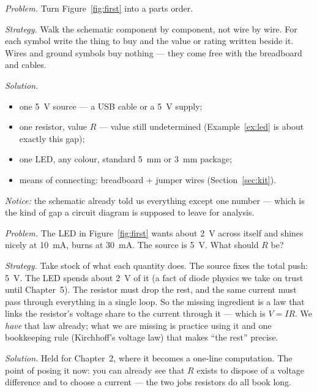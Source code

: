 \begin{example}
\label{ex:partslist}
\emph{Problem.} Turn Figure~\ref{fig:first} into a parts order.\par
\emph{Strategy.} Walk the schematic component by component, not wire by wire.
For each symbol write the thing to buy and the value or rating written beside
it. Wires and ground symbols buy nothing — they come free with the breadboard
and cables.\par
\emph{Solution.}
\begin{itemize}
\item one \qty{5}{\volt} source — a USB cable or a \qty{5}{\volt} supply;
\item one resistor, value $R$ — value still undetermined
(Example~\ref{ex:led} is about exactly this gap);
\item one LED, any colour, standard \qty{5}{\milli\metre} or
\qty{3}{\milli\metre} package;
\item means of connecting: breadboard + jumper wires (Section~\ref{sec:kit}).
\end{itemize}
\emph{Notice:} the schematic already told us everything except one number —
which is the kind of gap a circuit diagram is supposed to leave for analysis.
\end{example}

\begin{example}
\label{ex:led}
\emph{Problem.} The LED in Figure~\ref{fig:first} wants about \qty{2}{\volt}
across itself and shines nicely at \qty{10}{\milli\ampere}, burns at
\qty{30}{\milli\ampere}. The source is \qty{5}{\volt}. What should $R$
be?\par
\emph{Strategy.} Take stock of what each quantity does. The source fixes the
total push: \qty{5}{\volt}. The LED spends about \qty{2}{\volt} of it (a fact of
diode physics we take on trust until Chapter~5). The resistor must drop the
rest, and the same current must pass through everything in a single loop. So
the missing ingredient is a law that links the resistor's voltage share to the
current through it — which is $V = IR$. We \emph{have} that law already; what
we are missing is practice using it and one bookkeeping rule (Kirchhoff's
voltage law) that makes ``the rest'' precise.\par
\emph{Solution.} Held for Chapter~2, where it becomes a one-line computation.
The point of posing it now: you can already see that $R$ exists to dispose of a
voltage difference and to choose a current — the two jobs resistors do all book
long.
\end{example}

